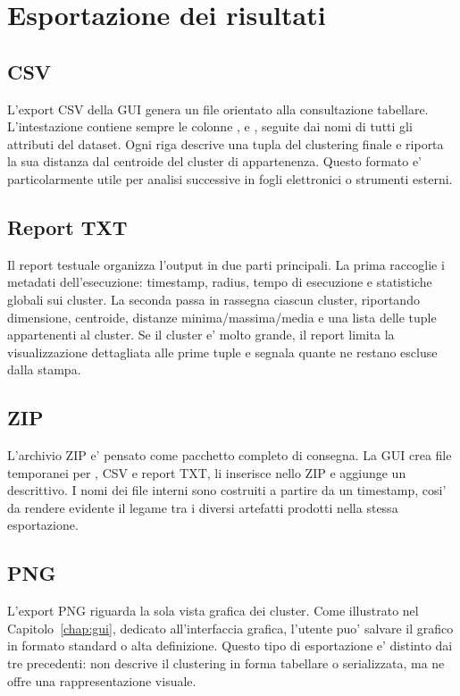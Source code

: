 \section{Esportazione dei risultati}

\subsection{CSV}

L'export CSV della GUI genera un file orientato alla consultazione tabellare.
L'intestazione contiene sempre le colonne ,  e
, seguite dai nomi di tutti gli attributi del dataset. Ogni
riga descrive una tupla del clustering finale e riporta la sua distanza dal centroide del
cluster di appartenenza. Questo formato e' particolarmente utile per analisi successive
in fogli elettronici o strumenti esterni.

\subsection{Report TXT}

Il report testuale organizza l'output in due parti principali. La prima raccoglie i
metadati dell'esecuzione: timestamp, radius, tempo di esecuzione e statistiche globali
sui cluster. La seconda passa in rassegna ciascun cluster, riportando dimensione,
centroide, distanze minima/massima/media e una lista delle tuple appartenenti al cluster.
Se il cluster e' molto grande, il report limita la visualizzazione dettagliata alle prime
tuple e segnala quante ne restano escluse dalla stampa.

\subsection{ZIP}

L'archivio ZIP e' pensato come pacchetto completo di consegna. La GUI crea file
temporanei per , CSV e report TXT, li inserisce nello ZIP e aggiunge un
 descrittivo. I nomi dei file interni sono costruiti a partire da un
timestamp, cosi' da rendere evidente il legame tra i diversi artefatti prodotti nella
stessa esportazione.

\subsection{PNG}

L'export PNG riguarda la sola vista grafica dei cluster. Come illustrato nel
Capitolo~\ref{chap:gui}, dedicato all'interfaccia grafica, l'utente puo' salvare il
grafico in formato standard o alta definizione. Questo tipo di esportazione e' distinto
dai tre precedenti: non descrive il clustering in forma tabellare o serializzata, ma ne
offre una rappresentazione visuale.

